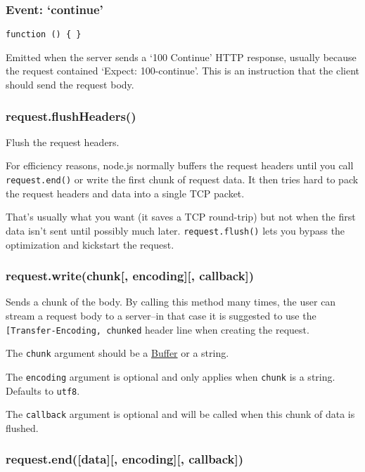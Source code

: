 \subsubsection{\texorpdfstring{Event:
`continue'}{Event: continue}}\label{event-continue}

\texttt{function\ ()\ \{\ \}}

Emitted when the server sends a `100 Continue' HTTP response, usually
because the request contained `Expect: 100-continue'. This is an
instruction that the client should send the request body.

\subsubsection{request.flushHeaders()}\label{request.flushheaders}

Flush the request headers.

For efficiency reasons, node.js normally buffers the request headers
until you call \texttt{request.end()} or write the first chunk of
request data. It then tries hard to pack the request headers and data
into a single TCP packet.

That's usually what you want (it saves a TCP round-trip) but not when
the first data isn't sent until possibly much later.
\texttt{request.flush()} lets you bypass the optimization and kickstart
the request.

\subsubsection{request.write(chunk{[}, encoding{]}{[},
callback{]})}\label{request.writechunk-encoding-callback}

Sends a chunk of the body. By calling this method many times, the user
can stream a request body to a server--in that case it is suggested to
use the
\texttt{{[}\textquotesingle{}Transfer-Encoding\textquotesingle{},\ \textquotesingle{}chunked\textquotesingle{}{]}}
header line when creating the request.

The \texttt{chunk} argument should be a
\href{buffer.html\#buffer_buffer}{Buffer} or a string.

The \texttt{encoding} argument is optional and only applies when
\texttt{chunk} is a string. Defaults to
\texttt{\textquotesingle{}utf8\textquotesingle{}}.

The \texttt{callback} argument is optional and will be called when this
chunk of data is flushed.

\subsubsection{request.end({[}data{]}{[}, encoding{]}{[},
callback{]})}\label{request.enddata-encoding-callback}

